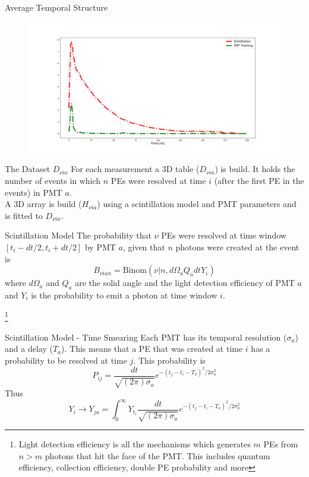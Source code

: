 \documentclass{beamer}
\newcommand\blfootnote[1]{%
  \begingroup
  \renewcommand\thefootnote{}\footnote{#1}%
  \addtocounter{footnote}{-1}%
  \endgroup
}
\begin{document}
\begin{frame}{Average Temporal Structure}
\begin{figure}[h]
    \centering
    \includegraphics[width=1\textwidth]{temp.png}
\end{figure}
\end{frame}

\begin{frame}{The Dataset $D_{\nu ia}$}
For each measurement a 3D table ($D_{\nu ia}$) is build. It holds the number of events in which $n$ PEs were resolved at time $i$ (after the first PE in the events) in PMT $a$.\\

A 3D array is build ($H_{\nu ia}$) using a scintillation model and PMT parameters and is fitted to $D_{\nu ia}$.
\end{frame}


\begin{frame}{Scintillation Model}
The probability that $\nu$ PEs were resolved at time window $[t_i-dt/2, t_i+dt/2]$ by PMT $a$, given that $n$ photons were created at the event is
\begin{equation}
B_{\nu ian}=\text{Binom}(\nu|n,d\Omega_aQ_adtY_{i})
\end{equation}
where $d\Omega_a$ and $Q_a$ are the solid angle and the light detection efficiency of PMT $a$ and $Y_i$ is the probability to emit a photon at time window $i$.

\blfootnote{Light detection efficiency is all the mechanisms which generates $m$ PEs from $n>m$ photons that hit the face of the PMT. This includes quantum efficiency, collection efficiency, double PE probability and more}
\end{frame}

\begin{frame}{Scintillation Model - Time Smearing}
Each PMT has its temporal resolution ($\sigma_a$) and a delay ($T_a$).
This means that a PE that was created at time $i$ has a probability to be resolved at time $j$. This probability is
\begin{equation}
P_{ij}=\frac{dt}{\sqrt{(2\pi)\sigma_a}}e^{-(t_j-t_i-T_a)^2/2\sigma_a^2}
\end{equation}
Thus
\begin{equation}
Y_i\rightarrow Y_{ja}=\int_0^{\infty}Y_{t_i}\frac{dt}{\sqrt{(2\pi)\sigma_a}}e^{-(t_j-t_i-T_a)^2/2\sigma_a^2}
\end{equation}

\end{frame}
\end{document}
